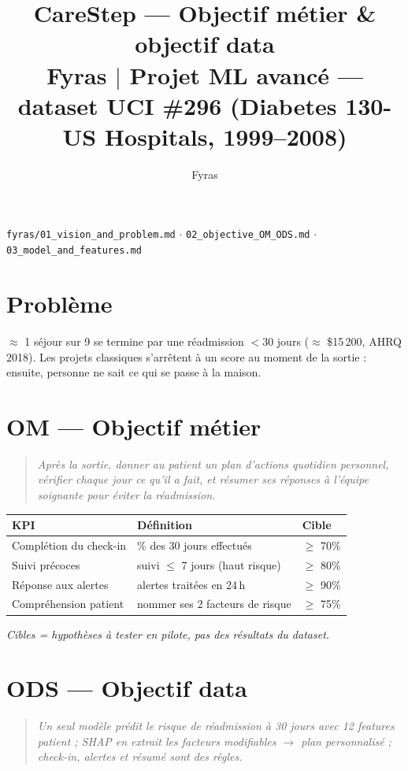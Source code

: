 \documentclass[11pt,a4paper]{article}
\title{\textbf{CareStep} --- Objectif m\'etier \& objectif data\\
\large Fyras $\mid$ Projet ML avanc\'e --- dataset UCI \#296 (Diabetes 130-US Hospitals, 1999--2008)}
\author{Fyras}
\date{}
\begin{document}
\maketitle

\begin{center}
\small\texttt{fyras/01\_vision\_and\_problem.md} \;$\cdot$\;
\texttt{02\_objective\_OM\_ODS.md} \;$\cdot$\;
\texttt{03\_model\_and\_features.md}
\end{center}

\section*{Probl\`eme}
$\approx$ 1 s\'ejour sur 9 se termine par une r\'eadmission $<$30 jours ($\approx$ \$15\,200, AHRQ 2018).
Les projets classiques s'arr\^etent \`a un score au moment de la sortie : ensuite, personne ne sait ce qui se passe \`a la maison.

\section*{OM --- Objectif m\'etier}
\begin{quote}
\itshape
Apr\`es la sortie, donner au patient un plan d'actions quotidien personnel, v\'erifier chaque jour ce qu'il a fait, et r\'esumer ses r\'eponses \`a l'\'equipe soignante pour \'eviter la r\'eadmission.
\end{quote}

\small


{\centering
\begin{tabularx}{\textwidth}{@{}XXl@{}}
\toprule
\textbf{KPI} & \textbf{D\'efinition} & \textbf{Cible} \\
\midrule
Compl\'etion du check-in & \% des 30 jours effectu\'es & $\ge$ 70\% \\
Suivi pr\'ecoces & suivi $\le$ 7 jours (haut risque) & $\ge$ 80\% \\
R\'eponse aux alertes & alertes trait\'ees en 24\,h & $\ge$ 90\% \\
Compr\'ehension patient & nommer ses 2 facteurs de risque & $\ge$ 75\% \\
\bottomrule
\end{tabularx}
\par}

\par\vspace{2pt}
\itshape Cibles = hypoth\`eses \`a tester en pilote, pas des r\'esultats du dataset.

\section*{ODS --- Objectif data}
\begin{quote}
\itshape
Un seul mod\`ele pr\'edit le risque de r\'eadmission \`a 30 jours avec 12 features patient ; SHAP en extrait les facteurs modifiables $\to$ plan personnalis\'e ; check-in, alertes et r\'esum\'e sont des r\`egles.
\end{quote}
\end{document}
